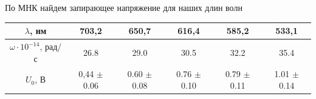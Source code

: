 \documentclass[12pt,a4paper]{article}
\begin{document}
\begin{figure}[H]
\begin{minipage}[h]{0.48\linewidth}
 \\
\end{minipage}
\hfill
\begin{minipage}[h]{0.48\linewidth}
 \\
\end{minipage}
\end{figure}

По МНК найдем запирающее напряжение для наших длин волн

\begin{center}
\begin{tabular}{|c|c|c|c|c|c|}
\hline 
$\lambda$, нм & 703,2 & 650,7 & 616,4 & 585,2 & 533,1 \\ 
\hline 
$\omega\cdot 10^{-14}$, рад/с  & 26.8 & 29.0 & 30.5 & 32.2 & 35.4 \\ 
\hline 
$U_0$, В & 0,44 $\pm$ 0.06 & 0.60 $\pm$ 0.08 & 0.76 $\pm$ 0.10 & 0.79 $\pm$ 0.11 & 1.01 $\pm$ 0.14 \\ 
\hline 
\end{tabular} 
\end{center}
\end{document}
